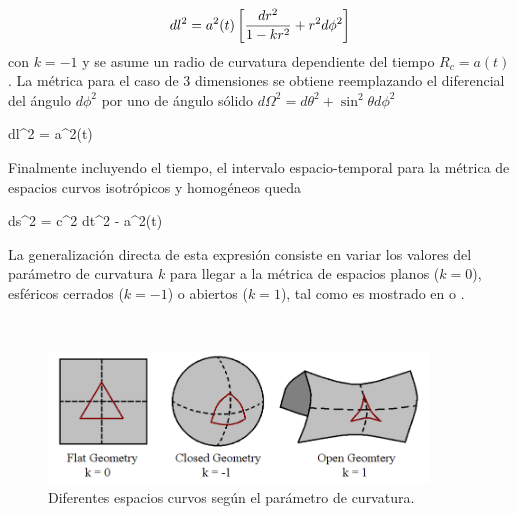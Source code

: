 \[ dl^2 = a^2(t) \left[  \frac{dr^2}{1-kr^2} + r^2 d\phi^2  \right] \]
con $k = -1$ y se asume un radio de curvatura dependiente del tiempo 
$R_c = a(t)$.
La métrica para el caso de 3 dimensiones se obtiene reemplazando el 
diferencial del ángulo $d\phi^2$ por uno de ángulo sólido $d\Omega^2 = 
d\theta^2 + \sin^2\theta d\phi^2$

 
{ dl^2 = a^2(t)  }


Finalmente incluyendo el tiempo, el intervalo espacio-temporal para la 
métrica de espacios curvos isotrópicos y homogéneos queda


{ ds^2 = c^2 dt^2 - a^2(t)  }


La generalización directa de esta expresión consiste en variar los valores
del parámetro de curvatura $k$ para llegar a la métrica de espacios planos 
($k = 0$), esféricos cerrados ($k = -1$) o abiertos ($k = 1$), tal como
es mostrado en \cite{longair2008} o \cite{padmanabhan1995}.

\
\begin{figure}[htbp]
	\centering
	\includegraphics[width=0.9\textwidth]
	{./figures/2_theoretical_framework/Curved_Spaces.png}

	\caption{\small{Diferentes espacios curvos según el parámetro de curvatura.}}
	
	\label{fig:CurvedSpaces}
\end{figure}
\


